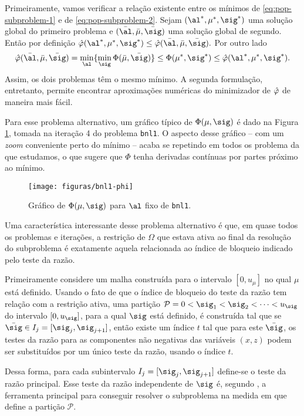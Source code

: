 Primeiramente, vamos verificar a relação existente entre os mínimos de \eqref{eq:pop-subproblem-1} e de \eqref{eq:pop-subproblem-2}. Sejam $(\al^*,\mu^*,\sig^*)$ uma solução global do  primeiro problema e $(\bar{\al}, \bar{\mu},\bar{\sig})$ uma solução global de segundo. Então por definição
$ \nextphi(\al^*,\mu^*,\sig^*) \leq \nextphi (\bar{\al},\bar{\mu},\bar{\sig}).$
Por outro lado 
\[
\nextphi(\baral,\barmu,\barsig) = \min_{\al}\{ \min_{\sig}\Phi(\barmu,\barsig)\} \leq \Phi(\mu^{*},\sig^{*}) \leq \nextphi(\al^*,\mu^*,\sig^*).
\]
Assim, os dois problemas têm o mesmo mínimo. A segunda formulação, entretanto, permite encontrar aproximações numéricas do minimizador de $\hat{\varphi}$ de maneira mais fácil. 

Para esse problema alternativo, um gráfico típico de $\Phi(\mu,\sig)$ é dado na Figura \ref{fig:bnl1-Phi}, tomada na iteração \num{4} do problema \texttt{bnl1}. O aspecto desse gráfico --  com um \emph{zoom} conveniente perto do mínimo --  acaba se repetindo  em todos os problema da  que estudamos, o que sugere que $\Phi$ tenha derivadas contínuas por partes próximo ao mínimo.

\begin{figure}[htbp]
\centering
\texttt{[image: figuras/bnl1-phi]}
  	\caption{\label{fig:bnl1-Phi} Gráfico de $\Phi(\mu,\sig)$ para $\al$ fixo de \texttt{bnl1}.}
  \end{figure}

 Uma característica interessante desse problema alternativo é que, em quase todos os problemas e iterações, a restrição de $\Omega$ que estava ativa ao final da resolução do subproblema é exatamente aquela relacionada ao índice de bloqueio indicado pelo teste da razão.

Primeiramente considere  um malha construída para o intervalo $[0,u_{\mu}]$ no qual  $\mu$ está definido. Usando o fato de que o índice de bloqueio do teste da razão tem relação com a restrição ativa, uma partição $\mathcal{P} = 0<\sig_{1}<\sig_{2}<\cdots<u_{\sig}$ do intervalo $[0,u_{\sig}]$, para  a  qual $\sig$ está definido, é construída tal que se $\barsig\in I_{j} = [\sig_{j},\sig_{j+1}]$, então existe um índice $t$ tal que para este $\barsig$,  os testes da razão para as componentes não negativas das variáveis $(x,z)$ podem ser substituídos por um único teste da razão, usando o índice $t$. 

Dessa forma, para cada subintervalo $I_{j} = [\sig_{j},\sig_{j+1}]$ define-se o teste da razão principal. Esse teste da razão independente de $\sig$ é, segundo \textcite{VillasBoas:2012ur,VillasBoas2013:wn}, a ferramenta principal para conseguir resolver o subproblema na medida em que define a partição $\mathcal{P}$.

